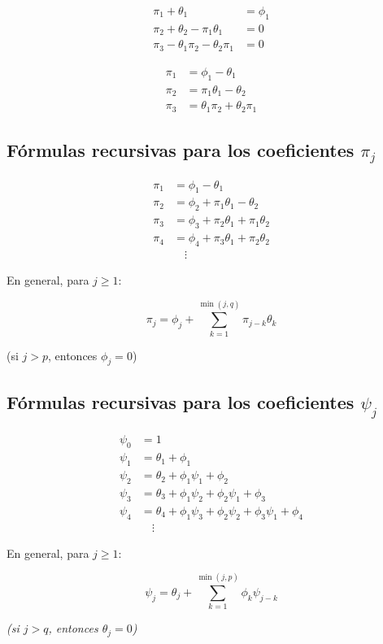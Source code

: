 \documentclass[12pt]{article} %
\begin{document}
\begin{multicols}{2}
\begin{align*}
\pi_1 + \theta_1 &= \phi_1 \\
\pi_2 + \theta_2 - \pi_1 \theta_1 &= 0 \\
\pi_3 - \theta_1 \pi_2 - \theta_2 \pi_1 &= 0
\end{align*}


\[
\begin{aligned}
\pi_1 &= \phi_1 - \theta_1 \\
\pi_2 &=  \pi_1 \theta_1 - \theta_2 \\
\pi_3 &= \theta_1 \pi_2 + \theta_2 \pi_1
\end{aligned}
\]

\subsection*{Fórmulas recursivas para los coeficientes $\pi_j$}

\[
\begin{aligned}
\pi_1 &= \phi_1 - \theta_1 \\
\pi_2 &= \phi_2 + \pi_1 \theta_1 - \theta_2 \\
\pi_3 &= \phi_3 + \pi_2 \theta_1 + \pi_1 \theta_2 \\
\pi_4 &= \phi_4 + \pi_3 \theta_1 + \pi_2 \theta_2 \\
&\quad \vdots
\end{aligned}
\]

En general, para \( j \geq 1 \):

\[
\pi_j = \phi_j + \sum_{k=1}^{\min(j,q)} \pi_{j-k} \theta_k
\]

(si \( j > p \), entonces \( \phi_j = 0 \))

\subsection*{Fórmulas recursivas para los coeficientes $\psi_j$}

\[
\begin{aligned}
\psi_0 &= 1 \\
\psi_1 &= \theta_1 + \phi_1 \\
\psi_2 &= \theta_2 + \phi_1 \psi_1 + \phi_2 \\
\psi_3 &= \theta_3 + \phi_1 \psi_2 + \phi_2 \psi_1 + \phi_3 \\
\psi_4 &= \theta_4 + \phi_1 \psi_3 + \phi_2 \psi_2 + \phi_3 \psi_1 + \phi_4 \\
&\quad \vdots
\end{aligned}
\]

En general, para \( j \geq 1 \):

\[
\psi_j = \theta_j + \sum_{k=1}^{\min(j,p)} \phi_k \psi_{j-k}
\]

\textit{(si \( j > q \), entonces \( \theta_j = 0 \))}


\end{multicols}
\end{document}
